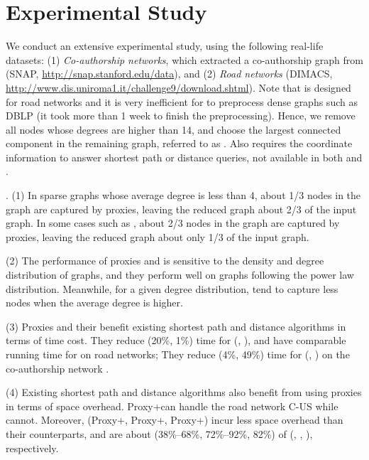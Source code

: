 \section{Experimental Study}
\label{sec-expt}


We conduct an extensive experimental study, using the following real-life datasets: 
%
(1) {\em Co-authorship networks}, which extracted a co-authorship graph from \dblp (SNAP, \url{http://snap.stanford.edu/data}),
 and (2) {\em Road networks} (DIMACS, \url{http://www.dis.uniroma1.it/challenge9/download.shtml}).
Note that \tnr is designed for road networks and it is very inefficient for \tnr to preprocess dense graphs such as DBLP (it took more than 1 week to finish the preprocessing). Hence, we remove all nodes whose degrees are higher than 14, and choose the largest connected component in the remaining graph, referred to as \dblpone. Also \ah requires the coordinate information to answer shortest path or distance queries, not available in both \dblp and \dblpone.

.
(1) In sparse graphs whose average degree is less than 4, about 1/3 nodes in the graph are captured by proxies, leaving the reduced graph about 2/3 of the input graph. In some cases such as \dblpone, about 2/3 nodes in the graph are captured by proxies, leaving the reduced graph about only 1/3 of the input graph.

\sstab(2) The performance of proxies and \dras is sensitive to the density and degree distribution of graphs, and they perform well on graphs following the power law distribution. Meanwhile, for a given degree distribution, \dras tend to capture less nodes when the average degree is higher.

\sstab(3) Proxies and their \dras benefit existing shortest path and distance algorithms in terms of time cost. They reduce (20\%, 1\%) time for (\arcflag, \ah), and have comparable running time for \tnr on road networks; They reduce (4\%, 49\%) time for (\arcflag, \tnr) on the co-authorship network \dblpone.

\sstab(4) Existing shortest path and distance algorithms also benefit from using proxies in terms of space overhead. Proxy+\tnr can handle the road network C-US while \tnr cannot. Moreover, (Proxy+\arcflag, Proxy+\tnr, Proxy+\ah) incur less space overhead than their counterparts, and are about (38\%--68\%, 72\%--92\%, 82\%) of (\arcflag, \tnr, \ah), respectively.

